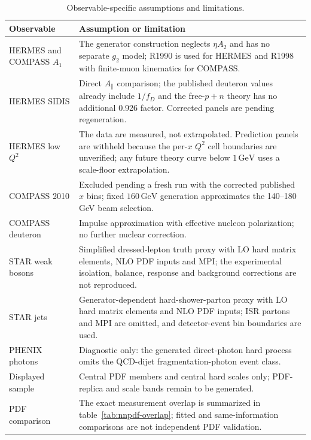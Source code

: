 \documentclass[11pt,a4paper]{article}
\newcommand{\GeV}{\ensuremath{\,\mathrm{GeV}}}
\begin{document}
\begin{table}[h]
  \centering
  \caption{Observable-specific assumptions and limitations.}
  \small
  \begin{tabular}{@{}p{}p{}@{}}
    \toprule
    Observable & Assumption or limitation \\
    \midrule
    HERMES and COMPASS $A_1$ & The generator construction neglects $\eta A_2$ and has no separate $g_2$ model; R1990 is used for HERMES and R1998 with finite-muon kinematics for COMPASS. \\
    HERMES SIDIS & Direct $A_\parallel$ comparison; the published deuteron values already include $1/f_D$ and the free-$p+n$ theory has no additional 0.926 factor.  Corrected panels are pending regeneration. \\
    HERMES low $Q^2$ & The data are measured, not extrapolated.  Prediction panels are withheld because the per-$x$ $Q^2$ cell boundaries are unverified; any future theory curve below $1\GeV$ uses a scale-floor extrapolation. \\
    COMPASS 2010 & Excluded pending a fresh run with the corrected published $x$ bins; fixed $160\GeV$ generation approximates the 140--180 GeV beam selection. \\
    COMPASS deuteron & Impulse approximation with effective nucleon polarization; no further nuclear correction. \\
    STAR weak bosons & Simplified dressed-lepton truth proxy with LO hard matrix elements, NLO PDF inputs and MPI; the experimental isolation, balance, response and background corrections are not reproduced. \\
    STAR jets & Generator-dependent hard-shower-parton proxy with LO hard matrix elements and NLO PDF inputs; ISR partons and MPI are omitted, and detector-event bin boundaries are used. \\
    PHENIX photons & Diagnostic only: the generated direct-photon hard process omits the QCD-dijet fragmentation-photon event class. \\
    Displayed sample & Central PDF members and central hard scales only; PDF-replica and scale bands remain to be generated. \\
    PDF comparison & The exact measurement overlap is summarized in
    table~\ref{tab:nnpdf-overlap}; fitted and same-information comparisons
    are not independent PDF validation. \\
    \bottomrule
  \end{tabular}
\end{table}



\end{document}
